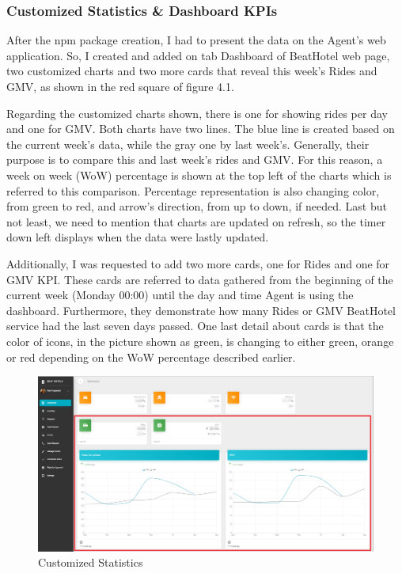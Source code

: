 \subsubsection{Customized Statistics \& Dashboard KPIs}
After the npm package creation, I had to present the data on the Agent's web application. So, I created and added on tab Dashboard of BeatHotel web page, two customized charts and two more cards that reveal this week's Rides and GMV, as shown in the red square of figure 4.1.   \par
Regarding the customized charts shown, there is one for showing rides per day and one for GMV. Both charts have two lines. The blue line is created based on the current week's data, while the gray one by last week's. Generally, their purpose is to compare this and last week's rides and GMV. For this reason, a week on week (WoW) percentage is shown at the top left of the charts which is referred to this comparison. Percentage representation is also changing color, from green to red, and arrow's direction, from up to down, if needed. Last but not least, we need to mention that charts are updated on refresh, so the timer down left displays when the data were lastly updated. \par 
Additionally, I was requested to add two more cards, one for Rides and one for GMV KPI. These cards are referred to data gathered from the beginning of the current week (Monday 00:00) until the day and time Agent is using the dashboard. Furthermore, they demonstrate how many Rides or GMV BeatHotel service had the last seven days passed. One last detail about cards is that the color of icons, in the picture shown as green, is changing to either green, orange or red depending on the WoW percentage described earlier. \par

\begin{figure}[H]
	\begin{center}
		\includegraphics[scale=0.25]{images/my_projects/Statistics/feature-dashboard-statistics.png}
	\end{center}
	\caption{Customized Statistics}
\end{figure}

